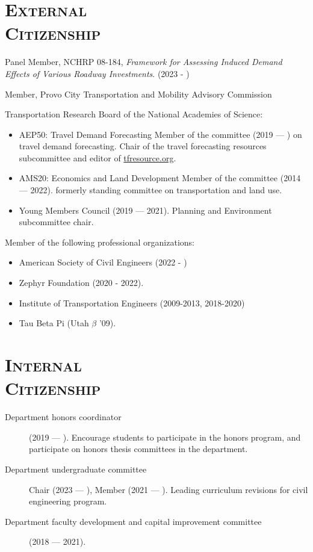 \documentclass[margin,line]{res}
\newcommand{\secfont}{\scshape }
\begin{document}
\begin{resume}
\noindent\makebox[\linewidth]{\rule{\linewidth}{0.4pt}}
\section{\secfont External \\ Citizenship}



Panel Member, NCHRP 08-184, \textit{Framework for Assessing Induced Demand Effects of Various Roadway Investments}. (2023 - )

Member, Provo City Transportation and Mobility Advisory Commission

Transportation Research Board of the National Academies of Science:

\begin{itemize}
  \item AEP50: Travel Demand Forecasting Member of the committee (2019 --- ) on
  travel demand forecasting. Chair of the travel forecasting resources
  subcommittee and editor of \url{tfresource.org}.
  \item AMS20: Economics and Land Development Member of the committee (2014
  --- 2022). formerly standing committee on transportation and land use.
  \item Young Members Council (2019 --- 2021). Planning and Environment subcommittee
  chair.
\end{itemize}



Member of the following professional organizations:

\begin{itemize}
  \item American Society of Civil Engineers (2022 - )
  \item Zephyr Foundation (2020 - 2022).
  \item Institute of Transportation Engineers (2009-2013, 2018-2020)
  \item Tau Beta Pi (Utah $\beta$ '09).
\end{itemize}


\noindent\makebox[\linewidth]{\rule{\linewidth}{0.4pt}}
\section{\secfont Internal \\ Citizenship}
\begin{description}
  \item[Department honors coordinator] (2019 --- ). Encourage students to participate
  in the honors program, and participate on honors thesis committees in the
  department.
  \item[Department undergraduate committee] Chair (2023 --- ), Member (2021 --- ). Leading curriculum revisions for civil engineering program.
  \item[Department faculty development and capital improvement committee] (2018 --- 2021).
\end{description}



\end{resume}
\end{document}

